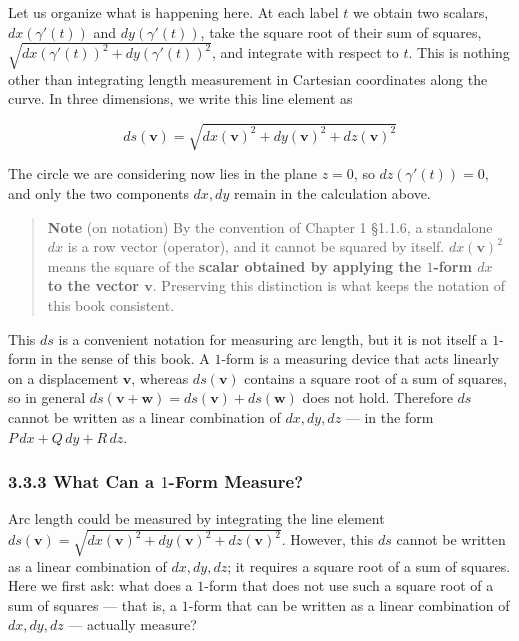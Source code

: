 \documentclass[a4paper,12pt,openany]{book}
\begin{document}
Let us organize what is happening here. At each label \(t\) we obtain
two scalars, \(dx(\gamma'(t))\) and \(dy(\gamma'(t))\), take the square
root of their sum of squares,
\(\sqrt{dx(\gamma'(t))^2 + dy(\gamma'(t))^2}\), and integrate with
respect to \(t\). This is nothing other than integrating length
measurement in Cartesian coordinates along the curve. In three
dimensions, we write this line element as

\[ds(\mathbf{v}) = \sqrt{dx(\mathbf{v})^2 + dy(\mathbf{v})^2 + dz(\mathbf{v})^2}\]

The circle we are considering now lies in the plane \(z=0\), so
\(dz(\gamma'(t))=0\), and only the two components \(dx, dy\) remain in
the calculation above.

\begin{quote}
\textbf{Note} (on notation) By the convention of Chapter 1 §1.1.6, a
standalone \(dx\) is a row vector (operator), and it cannot be squared
by itself. \(dx(\mathbf{v})^2\) means the square of the
\textbf{scalar obtained by applying the $1$-form $dx$ to the vector $\mathbf{v}$}.
Preserving this distinction is what keeps the notation of this book
consistent.
\end{quote}

This \(ds\) is a convenient notation for measuring arc length, but it is
not itself a \(1\)-form in the sense of this book. A \(1\)-form is a
measuring device that acts linearly on a displacement \(\mathbf{v}\),
whereas \(ds(\mathbf{v})\) contains a square root of a sum of squares,
so in general
\(ds(\mathbf{v}+\mathbf{w}) = ds(\mathbf{v})+ds(\mathbf{w})\) does not
hold. Therefore \(ds\) cannot be written as a linear combination of
\(dx, dy, dz\) — in the form \(P\,dx+Q\,dy+R\,dz\).

\hypertarget{what-can-a-1-form-measure}{%
\subsubsection{\texorpdfstring{3.3.3 What Can a \(1\)-Form
Measure?}{3.3.3 What Can a 1-Form Measure?}}\label{what-can-a-1-form-measure}}

Arc length could be measured by integrating the line element
\(ds(\mathbf{v}) = \sqrt{dx(\mathbf{v})^2 + dy(\mathbf{v})^2 + dz(\mathbf{v})^2}\).
However, this \(ds\) cannot be written as a linear combination of
\(dx, dy, dz\); it requires a square root of a sum of squares. Here we
first ask: what does a \(1\)-form that does not use such a square root
of a sum of squares — that is, a \(1\)-form that can be written as a
linear combination of \(dx, dy, dz\) — actually measure?
\end{document}
